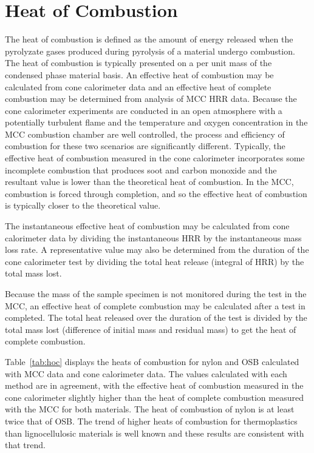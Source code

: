 \documentclass[12pt,oneside]{book}
\begin{document}
\section{Heat of Combustion}

The heat of combustion is defined as the amount of energy released when the pyrolyzate gases produced during pyrolysis of a material undergo combustion. The heat of combustion is typically presented on a per unit mass of the condensed phase material basis. An effective heat of combustion may be calculated from cone calorimeter data and an effective heat of complete combustion may be determined from analysis of MCC HRR data. Because the cone calorimeter experiments are conducted in an open atmosphere with a potentially turbulent flame and the temperature and oxygen concentration in the MCC combustion chamber are well controlled, the process and efficiency of combustion for these two scenarios are significantly different. Typically, the effective heat of combustion measured in the cone calorimeter incorporates some incomplete combustion that produces soot and carbon monoxide and the resultant value is lower than the theoretical heat of combustion. In the MCC, combustion is forced through completion, and so the effective heat of combustion is typically closer to the theoretical value. 

The instantaneous effective heat of combustion may be calculated from cone calorimeter data by dividing the instantaneous HRR by the instantaneous mass loss rate. A representative value may also be determined from the duration of the cone calorimeter test by dividing the total heat release (integral of HRR) by the total mass lost.

Because the mass of the sample specimen is not monitored during the test in the MCC, an effective heat of complete combustion may be calculated after a test in completed. The total heat released over the duration of the test is divided by the total mass lost (difference of initial mass and residual mass) to get the heat of complete combustion.

Table~\ref{tab:hoc} displays the heats of combustion for nylon and OSB calculated with MCC data and cone calorimeter data. The values calculated with each method are in agreement, with the effective heat of combustion measured in the cone calorimeter slightly higher than the heat of complete combustion measured with the MCC for both materials. The heat of combustion of nylon is at least twice that of OSB. The trend of higher heats of combustion for thermoplastics than lignocellulosic materials is well known and these results are consistent with that trend. 
\end{document}
